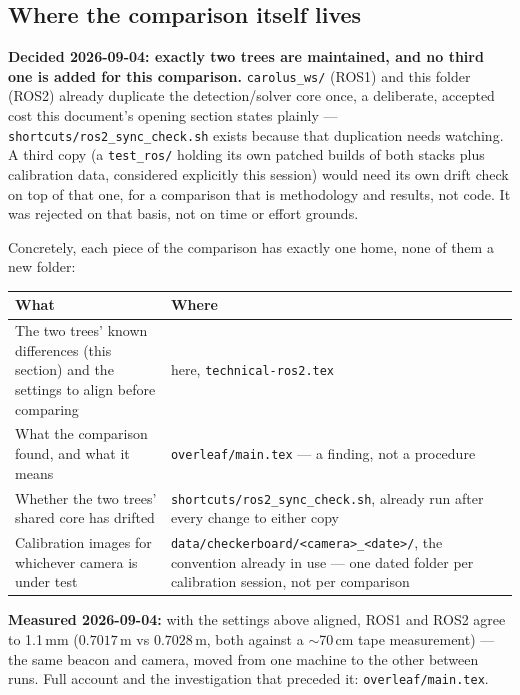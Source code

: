 \documentclass[11pt]{report}
\begin{document}
\subsection{Where the comparison itself lives}
\label{sec:ros2-vs-ros1-no-third-tree}

\textbf{Decided 2026-09-04: exactly two trees are maintained, and no third
one is added for this comparison.} \texttt{carolus\_ws/} (ROS1) and this
folder (ROS2) already duplicate the detection/solver core once, a
deliberate, accepted cost this document's opening section states plainly ---
\texttt{shortcuts/ros2\_sync\_check.sh} exists because that duplication needs
watching. A third copy (a \texttt{test\_ros/} holding its own patched builds
of both stacks plus calibration data, considered explicitly this session)
would need its own drift check on top of that one, for a comparison that is
methodology and results, not code. It was rejected on that basis, not on
time or effort grounds.

Concretely, each piece of the comparison has exactly one home, none of them
a new folder:

\begin{center}
\begin{tabular}{@{}p{}p{}@{}}
\toprule
What & Where \\
\midrule
The two trees' known differences (this section) and the settings to align before comparing & here, \texttt{technical-ros2.tex} \\
What the comparison found, and what it means & \texttt{overleaf/main.tex} --- a finding, not a procedure \\
Whether the two trees' shared core has drifted & \texttt{shortcuts/ros2\_sync\_check.sh}, already run after every change to either copy \\
Calibration images for whichever camera is under test & \texttt{data/checkerboard/<camera>\_<date>/}, the convention already in use --- one dated folder per calibration session, not per comparison \\
\bottomrule
\end{tabular}
\end{center}

\textbf{Measured 2026-09-04:} with the settings above aligned, ROS1 and
ROS2 agree to 1.1\,mm ($0.7017$\,m vs $0.7028$\,m, both against a
$\sim$70\,cm tape measurement) --- the same beacon and camera, moved from
one machine to the other between runs. Full account and the investigation
that preceded it: \texttt{overleaf/main.tex}.
\end{document}
